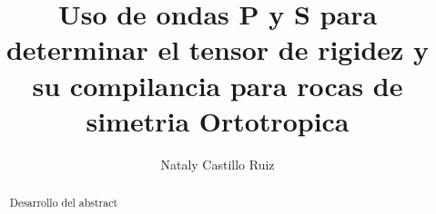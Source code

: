 \documentclass{article}
\title{Uso de ondas P y S para determinar el tensor de rigidez y su compilancia para rocas  de  simetria Ortotropica}
\author{Nataly Castillo Ruiz}
\begin{document}
\maketitle
\date{}

\begin{abstract}
 Desarrollo del abstract
\end{abstract}
\end{document}
